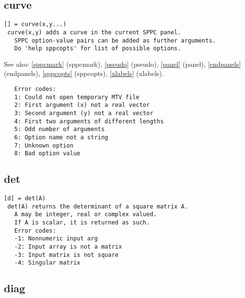 \documentclass[a4paper]{article}
\begin{document}
\subsection{curve\label{curve}}

\begin{tscreen}
\begin{verbatim}
[] = curve(x,y...)
 curve(x,y) adds a curve in the current SPPC panel.
   SPPC option-value pairs can be added as further arguments.
   Do 'help sppcopts' for list of possible options.
\end{verbatim}

See also: \ref{sppcmark} {(sppcmark)}, \ref{pseudo} {(pseudo)}, \ref{panel} {(panel)}, \ref{endpanels} {(endpanels)}, \ref{sppcopts} {(sppcopts)}, \ref{xlabels} {(xlabels)}.
\begin{verbatim}
   Error codes:
   1: Could not open temporary MTV file
   2: First argument (x) not a real vector
   3: Second argument (y) not a real vector
   4: First two arguments of different lengths
   5: Odd number of arguments
   6: Option name not a string
   7: Unknown option
   8: Bad option value
\end{verbatim}
\end{tscreen}





\subsection{det\label{det}}

\begin{tscreen}
\begin{verbatim}
[d] = det(A)
 det(A) returns the determinant of a square matrix A.
   A may be integer, real or complex valued.
   If A is scalar, it is returned as such.
   Error codes:
   -1: Nonnumeric input arg
   -2: Input array is not a matrix
   -3: Input matrix is not square
   -4: Singular matrix 
\end{verbatim}
\end{tscreen}





\subsection{diag\label{diag}}
\end{document}
